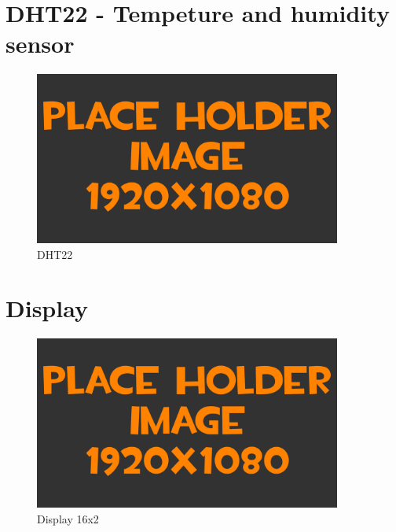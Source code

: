 \section{DHT22 - Tempeture and humidity sensor}

\begin{figure}[H]
	\centering
	\includegraphics[width=0.9\textwidth]{pictures/image.png}
	\caption{DHT22}
\end{figure}

\section{Display}

\begin{figure}[H]
	\centering
	\includegraphics[width=0.9\textwidth]{pictures/image.png}
	\caption{Display 16x2}
\end{figure}